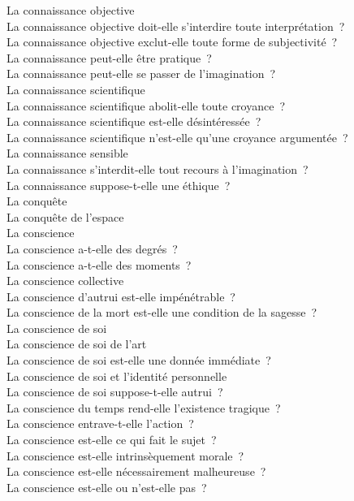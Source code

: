 \documentclass[a4paper,12pt]{article}
\begin{document}
La connaissance objective \\
La connaissance objective doit-elle s'interdire toute interprétation ? \\
La connaissance objective exclut-elle toute forme de subjectivité ? \\
La connaissance peut-elle être pratique ? \\
La connaissance peut-elle se passer de l'imagination ? \\
La connaissance scientifique \\
La connaissance scientifique abolit-elle toute croyance ? \\
La connaissance scientifique est-elle désintéressée ? \\
La connaissance scientifique n'est-elle qu'une croyance argumentée ? \\
La connaissance sensible \\
La connaissance s'interdit-elle tout recours à l'imagination ? \\
La connaissance suppose-t-elle une éthique ? \\
La conquête \\
La conquête de l'espace \\
La conscience \\
La conscience a-t-elle des degrés ? \\
La conscience a-t-elle des moments ? \\
La conscience collective \\
La conscience d'autrui est-elle impénétrable ? \\
La conscience de la mort est-elle une condition de la sagesse ? \\
La conscience de soi \\
La conscience de soi de l'art \\
La conscience de soi est-elle une donnée immédiate ? \\
La conscience de soi et l'identité personnelle \\
La conscience de soi suppose-t-elle autrui ? \\
La conscience du temps rend-elle l'existence tragique ? \\
La conscience entrave-t-elle l'action ? \\
La conscience est-elle ce qui fait le sujet ? \\
La conscience est-elle intrinsèquement morale ? \\
La conscience est-elle nécessairement malheureuse ? \\
La conscience est-elle ou n'est-elle pas ? \\
\end{document}
